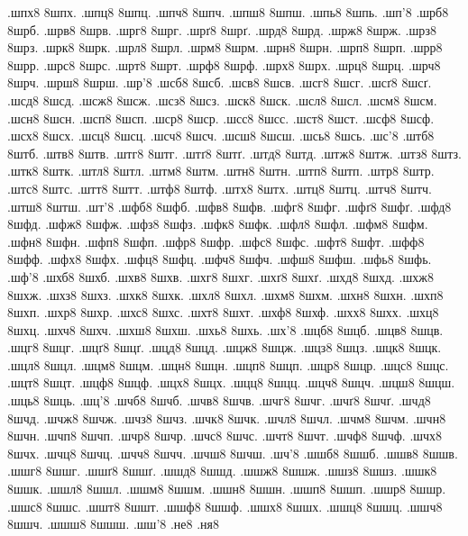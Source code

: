 {.шпх8
8шпх.
.шпц8
8шпц.
.шпч8
8шпч.
.шпш8
8шпш.
.шпь8
8шпь.
.шп'8
.шрб8
8шрб.
.шрв8
8шрв.
.шрг8
8шрг.
.шрґ8
8шрґ.
.шрд8
8шрд.
.шрж8
8шрж.
.шрз8
8шрз.
.шрк8
8шрк.
.шрл8
8шрл.
.шрм8
8шрм.
.шрн8
8шрн.
.шрп8
8шрп.
.шрр8
8шрр.
.шрс8
8шрс.
.шрт8
8шрт.
.шрф8
8шрф.
.шрх8
8шрх.
.шрц8
8шрц.
.шрч8
8шрч.
.шрш8
8шрш.
.шр'8
.шсб8
8шсб.
.шсв8
8шсв.
.шсг8
8шсг.
.шсґ8
8шсґ.
.шсд8
8шсд.
.шсж8
8шсж.
.шсз8
8шсз.
.шск8
8шск.
.шсл8
8шсл.
.шсм8
8шсм.
.шсн8
8шсн.
.шсп8
8шсп.
.шср8
8шср.
.шсс8
8шсс.
.шст8
8шст.
.шсф8
8шсф.
.шсх8
8шсх.
.шсц8
8шсц.
.шсч8
8шсч.
.шсш8
8шсш.
.шсь8
8шсь.
.шс'8
.штб8
8штб.
.штв8
8штв.
.штг8
8штг.
.штґ8
8штґ.
.штд8
8штд.
.штж8
8штж.
.штз8
8штз.
.штк8
8штк.
.штл8
8штл.
.штм8
8штм.
.штн8
8штн.
.штп8
8штп.
.штр8
8штр.
.штс8
8штс.
.штт8
8штт.
.штф8
8штф.
.штх8
8штх.
.штц8
8штц.
.штч8
8штч.
.штш8
8штш.
.шт'8
.шфб8
8шфб.
.шфв8
8шфв.
.шфг8
8шфг.
.шфґ8
8шфґ.
.шфд8
8шфд.
.шфж8
8шфж.
.шфз8
8шфз.
.шфк8
8шфк.
.шфл8
8шфл.
.шфм8
8шфм.
.шфн8
8шфн.
.шфп8
8шфп.
.шфр8
8шфр.
.шфс8
8шфс.
.шфт8
8шфт.
.шфф8
8шфф.
.шфх8
8шфх.
.шфц8
8шфц.
.шфч8
8шфч.
.шфш8
8шфш.
.шфь8
8шфь.
.шф'8
.шхб8
8шхб.
.шхв8
8шхв.
.шхг8
8шхг.
.шхґ8
8шхґ.
.шхд8
8шхд.
.шхж8
8шхж.
.шхз8
8шхз.
.шхк8
8шхк.
.шхл8
8шхл.
.шхм8
8шхм.
.шхн8
8шхн.
.шхп8
8шхп.
.шхр8
8шхр.
.шхс8
8шхс.
.шхт8
8шхт.
.шхф8
8шхф.
.шхх8
8шхх.
.шхц8
8шхц.
.шхч8
8шхч.
.шхш8
8шхш.
.шхь8
8шхь.
.шх'8
.шцб8
8шцб.
.шцв8
8шцв.
.шцг8
8шцг.
.шцґ8
8шцґ.
.шцд8
8шцд.
.шцж8
8шцж.
.шцз8
8шцз.
.шцк8
8шцк.
.шцл8
8шцл.
.шцм8
8шцм.
.шцн8
8шцн.
.шцп8
8шцп.
.шцр8
8шцр.
.шцс8
8шцс.
.шцт8
8шцт.
.шцф8
8шцф.
.шцх8
8шцх.
.шцц8
8шцц.
.шцч8
8шцч.
.шцш8
8шцш.
.шць8
8шць.
.шц'8
.шчб8
8шчб.
.шчв8
8шчв.
.шчг8
8шчг.
.шчґ8
8шчґ.
.шчд8
8шчд.
.шчж8
8шчж.
.шчз8
8шчз.
.шчк8
8шчк.
.шчл8
8шчл.
.шчм8
8шчм.
.шчн8
8шчн.
.шчп8
8шчп.
.шчр8
8шчр.
.шчс8
8шчс.
.шчт8
8шчт.
.шчф8
8шчф.
.шчх8
8шчх.
.шчц8
8шчц.
.шчч8
8шчч.
.шчш8
8шчш.
.шч'8
.шшб8
8шшб.
.шшв8
8шшв.
.шшг8
8шшг.
.шшґ8
8шшґ.
.шшд8
8шшд.
.шшж8
8шшж.
.шшз8
8шшз.
.шшк8
8шшк.
.шшл8
8шшл.
.шшм8
8шшм.
.шшн8
8шшн.
.шшп8
8шшп.
.шшр8
8шшр.
.шшс8
8шшс.
.шшт8
8шшт.
.шшф8
8шшф.
.шшх8
8шшх.
.шшц8
8шшц.
.шшч8
8шшч.
.шшш8
8шшш.
.шш'8
%
%
%
.не8
.ня8
%
}
